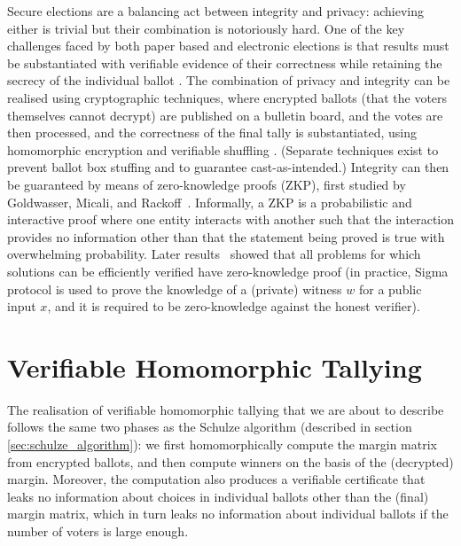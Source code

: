 Secure elections are a balancing act between integrity and privacy:
achieving either is trivial but their combination is notoriously hard.
One of the key challenges faced by both paper based and electronic
elections is that results must be substantiated with
verifiable evidence of their correctness while retaining the secrecy
of the individual ballot \citep{Bernhard:2017:PES}. 
The combination of privacy and integrity can be realised using cryptographic techniques, where
encrypted ballots (that the voters themselves cannot decrypt) are
published on a bulletin board, and the votes are then processed, and
the correctness of the final tally is substantiated, using
homomorphic encryption \citep{Hirt:2000:ERF} and verifiable shuffling
\citep{Bayer:2012:EZK}. (Separate techniques exist to prevent ballot
box stuffing and to guarantee cast-as-intended.)
Integrity can then be guaranteed by means of zero-knowledge proofs
(ZKP),
first studied by Goldwasser, Micali, and Rackoff~\citep{Goldwasser:1985:STOC}.
Informally, a ZKP is a probabilistic and interactive proof where one
entity interacts with another such that the interaction provides
no information other than that the statement being proved is true with
overwhelming probability. 
Later results~\citep{Ben-Or:1988:CRYPTO,Goldreich:1991:ACM}
showed that 
all problems for which solutions can be efficiently verified have zero-knowledge
proof (in practice,  Sigma protocol \citep{10.1007/3-540-48658-5_19} is used 
to prove the knowledge of a (private) witness $w$ for a public input $x$, 
and it is required to be zero-knowledge against the honest verifier).

  
 \section{Verifiable Homomorphic Tallying}
\label{sec:verifiable_homomorphic}
The realisation of verifiable homomorphic tallying that we are about to
describe follows the same two phases as the Schulze algorithm (described in section \ref{sec:schulze_algorithm}): 
we first homomorphically compute the margin matrix from encrypted ballots, and then compute
winners on the basis of the (decrypted) margin. Moreover, the computation also
produces a verifiable certificate that leaks no information about
choices in individual ballots other than the (final) margin matrix, which in
turn leaks no information about individual ballots if the number of
voters is large enough.  


